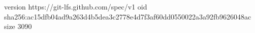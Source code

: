 version https://git-lfs.github.com/spec/v1
oid sha256:ac15dfb04ad9a263d4b5dea3c2778e4d7f3af60dd0550022a3a92fb9626048ac
size 3090

